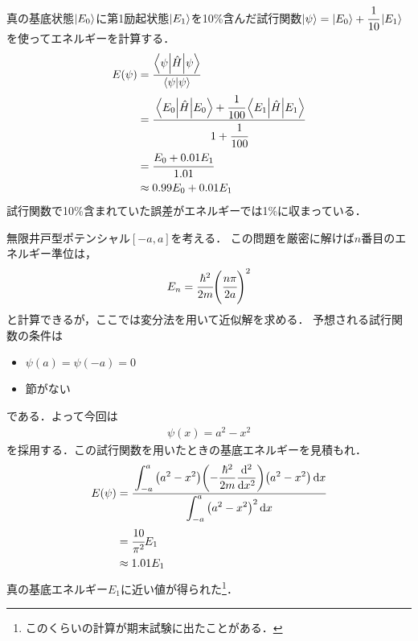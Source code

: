 \documentclass{report}
\begin{document}
  真の基底状態$\ket{E_0}$に第1励起状態$\ket{E_1}$を10\%含んだ試行関数$\ket{\psi} = \ket{E_0} + \cfrac{1}{10}\ket{E_1}$を使ってエネルギーを計算する．
  \begin{align}
    E(\psi) &= \frac{\mel**{\psi}{\hat{H}}{\psi}}{\braket{\psi}} \\
    &= \cfrac{\mel**{E_0}{\hat{H}}{E_0} + \cfrac{1}{100}\mel**{E_1}{\hat{H}}{E_1}}{1 + \cfrac{1}{100}} \\
    &= \cfrac{E_0 + 0.01E_1}{1.01}\\
    &\approx 0.99E_0 + 0.01E_1
  \end{align}
  試行関数で10\%含まれていた誤差がエネルギーでは1\%に収まっている．
  \begin{myex}{}{}
    無限井戸型ポテンシャル$[-a, a]$を考える．
    この問題を厳密に解けば$n$番目のエネルギー準位は，
    \begin{align}
      E_n = \cfrac{\hbar^2}{2m}\qty(\cfrac{n\pi}{2a})^2
    \end{align}
    と計算できるが，ここでは変分法を用いて近似解を求める．
    予想される試行関数の条件は
    \begin{itemize}
      \item $\psi(a) = \psi(-a) = 0$
      \item 節がない
    \end{itemize}
    である．よって今回は
    \begin{align}
      \psi(x) = a^2 - x^2
    \end{align}
    を採用する．この試行関数を用いたときの基底エネルギーを見積もれ．
    \tcblower
    \begin{align}
      E(\psi) &= \cfrac{\displaystyle \int_{-a}^{a}\qty(a^2 - x^2)\qty(-\frac{\hbar^2}{2m}\dv[2]{x})\qty(a^2 - x^2)\dd{x}}{\displaystyle \int_{-a}^{a}\qty(a^2 - x^2)^2\dd{x}} \\
      &= \cfrac{10}{\pi^2}E_1 \\
      &\approx 1.01E_1
    \end{align}
    真の基底エネルギー$E_1$に近い値が得られた\footnote{このくらいの計算が期末試験に出たことがある．}．
  \end{myex}
\end{document}
